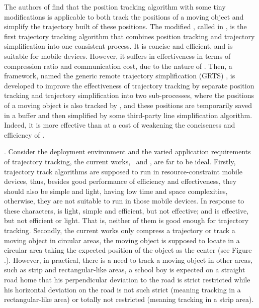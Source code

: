 The authors of \cite{Trajcevski:LDRH} find that the position tracking algorithm \ldr with some tiny modifications is applicable to both track the positions of a moving object and simplify the trajectory built of these positions. The modified \ldr,  called \ldrh in \cite{Lange:Tracking}, is the first trajectory tracking algorithm that combines position tracking and trajectory simplification into one consistent process. It is concise and efficient, and is suitable for mobile devices. However, it suffers in effectiveness in terms of compression ratio and communication cost, due to the nature of \ldr. 
%
Then, a framework, named the generic remote trajectory simplification (GRTS) \cite{Lange:GRTS,Lange:Tracking}, is developed to improve the effectiveness of trajectory tracking by separate position tracking and trajectory simplification into two sub-processes, where the positions of a moving object is also tracked by \ldr, and these positions are temporarily saved in a buffer and then simplified by some third-party line simplification algorithm. Indeed, it is more effective than \ldrh at a cost of weakening the conciseness and efficiency of \ldrh.
%



. Consider the deployment environment and the varied application requirements of trajectory tracking, the current works, \ie~\ldrh and \grts, are far to be ideal. Firstly, trajectory track algorithms are supposed to run in resource-constraint mobile devices, thus, besides good performance of efficiency and effectiveness, they should also be simple and light, \ie having low time and space complexities, otherwise, they are not suitable to run in those mobile devices. In response to these characters, \ldrh is light, simple and efficient, but not effective; and \grts is effective, but not efficient or light. That is, neither of them is good enough for trajectory tracking.
%
Secondly, the current works only compress a trajectory or track a moving object in circular areas, \ie the moving object is supposed to locate in a circular area taking the expected position of the object as the center (see Figure \todo.). However, in practical, there is a need to track a moving object in other areas, such as strip and rectangular-like areas, \eg a school boy is expected on a straight road home that his perpendicular deviation to the road is strict restricted while his horizontal deviation on the road is not such strict (meaning tracking in a rectangular-like area) or totally not restricted (meaning tracking in a strip area).





